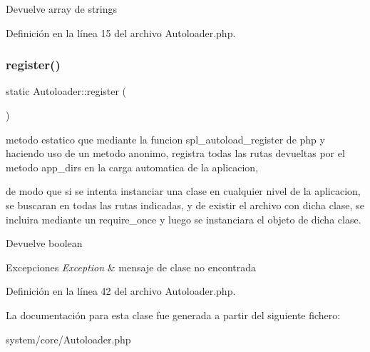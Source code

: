 \begin{DoxyReturn}{Devuelve}
array de strings 
\end{DoxyReturn}


Definición en la línea 15 del archivo Autoloader.\+php.

\mbox{\label{class_autoloader_a818817cb215d74d3c65e4855898b8902}} 
\subsubsection{\texorpdfstring{register()}{register()}}
{\footnotesize\ttfamily static Autoloader\+::register (\begin{DoxyParamCaption}{ }\end{DoxyParamCaption})\hspace{0.3cm}{\ttfamily [static]}}

metodo estatico que mediante la funcion spl\+\_\+autoload\+\_\+register de php y haciendo uso de un metodo anonimo, registra todas las rutas devueltas por el metodo app\+\_\+dirs en la carga automatica de la aplicacion,

de modo que si se intenta instanciar una clase en cualquier nivel de la aplicacion, se buscaran en todas las rutas indicadas, y de existir el archivo con dicha clase, se incluira mediante un require\+\_\+once y luego se instanciara el objeto de dicha clase.

\begin{DoxyReturn}{Devuelve}
boolean 
\end{DoxyReturn}

\begin{DoxyExceptions}{Excepciones}
{\em Exception} & mensaje de clase no encontrada \\
\hline
\end{DoxyExceptions}


Definición en la línea 42 del archivo Autoloader.\+php.



La documentación para esta clase fue generada a partir del siguiente fichero\+:\begin{DoxyCompactItemize}
\item 
system/core/Autoloader.\+php\end{DoxyCompactItemize}
